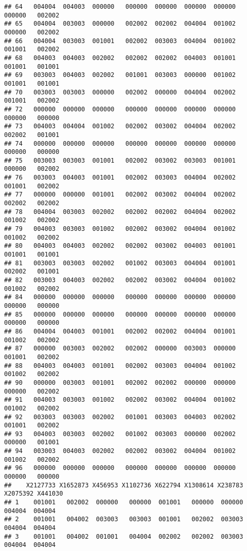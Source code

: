 \documentclass[
]{article}
\begin{document}
\begin{verbatim}
## 64   004004  004003  000000   000000  000000  000000  000000   000000   002002
## 65   004004  003003  000000   002002  002002  004004  001002   000000   002002
## 66   004004  003003  001001   002002  003003  004004  001002   001001   002002
## 68   004003  004003  002002   002002  002002  004003  001001   001001   001001
## 69   003003  004003  002002   001001  003003  000000  001002   001001   001001
## 70   003003  003003  000000   002002  000000  004004  002002   001001   002002
## 72   000000  000000  000000   000000  000000  000000  000000   000000   000000
## 73   004003  004004  001002   002002  003002  004004  002002   002002   001001
## 74   000000  000000  000000   000000  000000  000000  000000   000000   000000
## 75   003003  003003  001001   002002  003002  003003  001001   000000   002002
## 76   003003  004003  001001   002002  003003  004004  002002   001001   002002
## 77   000000  000000  001001   002002  003002  004004  002002   002002   002002
## 78   004004  003003  002002   002002  002002  004004  002002   001002   002002
## 79   004003  003003  001002   002002  003002  004004  001002   001002   002002
## 80   004003  004003  002002   002002  003002  004003  001001   001001   001001
## 81   003003  003003  002002   001002  003003  004004  001001   002002   001001
## 82   003003  004003  002002   002002  003002  004004  001002   001002   002002
## 84   000000  000000  000000   000000  000000  000000  000000   000000   000000
## 85   000000  000000  000000   000000  000000  000000  000000   000000   000000
## 86   004004  004003  001001   002002  002002  004004  001001   001002   002002
## 87   000000  003003  002002   002002  000000  003003  000000   001001   002002
## 88   004003  004003  001001   002002  003003  004004  001002   001002   002002
## 90   000000  003003  001001   002002  002002  000000  000000   000000   002002
## 91   004003  003003  001002   002002  003002  004004  001002   001002   002002
## 92   003003  003003  002002   001001  003003  004003  002002   001001   002002
## 93   004003  003003  002002   001002  003003  000000  002002   000000   001001
## 94   003003  004003  002002   002002  003002  004004  001002   001002   002002
## 96   000000  000000  000000   000000  000000  000000  000000   000000   000000
##    X2127733 X1652873 X456953 X1102736 X622794 X1308614 X238783 X2075392 X441030
## 1    001001   002002  000000   000000  001001   000000  000000   004004  004004
## 2    001001   004002  003003   003003  001001   002002  003003   004004  004004
## 3    001001   004002  001001   004004  002002   002002  003003   004004  004004

\end{verbatim}
\end{document}
